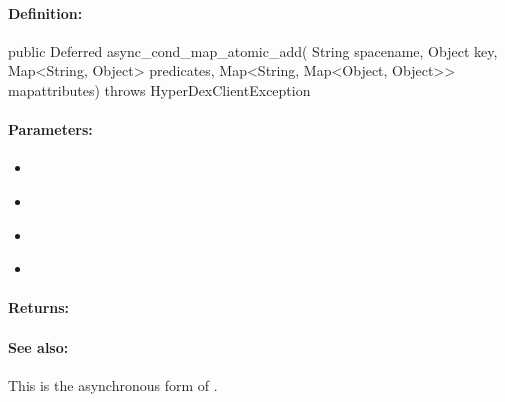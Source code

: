 \paragraph{Definition:}
\begin{javacode}
public Deferred async_cond_map_atomic_add(
        String spacename,
        Object key,
        Map<String, Object> predicates,
        Map<String, Map<Object, Object>> mapattributes) throws HyperDexClientException
\end{javacode}

\paragraph{Parameters:}
\begin{itemize}[noitemsep]
\item {}\\

\item {}\\

\item {}\\

\item {}\\

\end{itemize}

\paragraph{Returns:}


\paragraph{See also:}  This is the asynchronous form of .

\pagebreak
\subsubsection{}
\label{api:java:map_atomic_sub}


